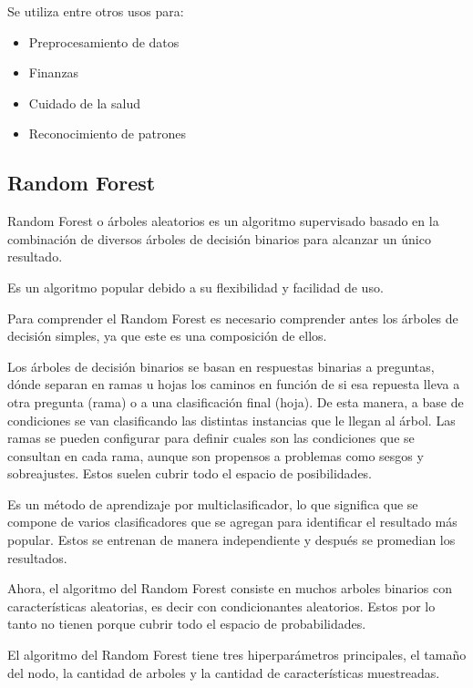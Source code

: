 Se utiliza entre otros usos para:

\begin{itemize}
	\item{Preprocesamiento de datos}
	
	\item{Finanzas}
	
	\item{Cuidado de la salud}
	
	\item{Reconocimiento de patrones} 
		
\end{itemize}

\subsection{Random Forest}
Random Forest \cite{ibmWhatRandom} o árboles aleatorios es un algoritmo supervisado basado en la combinación de diversos árboles de decisión binarios para alcanzar un único resultado.

Es un algoritmo popular debido a su flexibilidad y facilidad de uso.

Para comprender el Random Forest es necesario comprender antes los árboles de decisión simples, ya que este es una composición de ellos.

Los árboles de decisión binarios se basan en respuestas binarias a preguntas, dónde separan en ramas u hojas los caminos en función de si esa repuesta lleva a otra pregunta (rama) o a una clasificación final (hoja). De esta manera, a base de condiciones se van clasificando las distintas instancias que le llegan al árbol. Las ramas se pueden configurar para definir cuales son las condiciones que se consultan en cada rama, aunque son propensos a problemas como sesgos y sobreajustes. Estos suelen cubrir todo el espacio de posibilidades.

Es un método de aprendizaje por multiclasificador, lo que significa que se compone de varios clasificadores que se agregan para identificar el resultado más popular. Estos se entrenan de manera independiente y después se promedian los resultados.

Ahora, el algoritmo del Random Forest consiste en muchos arboles binarios con características aleatorias, es decir con condicionantes aleatorios. Estos por lo tanto no tienen porque cubrir todo el espacio de probabilidades.

El algoritmo del Random Forest tiene tres hiperparámetros principales, el tamaño del nodo, la cantidad de arboles y la cantidad de características muestreadas.

